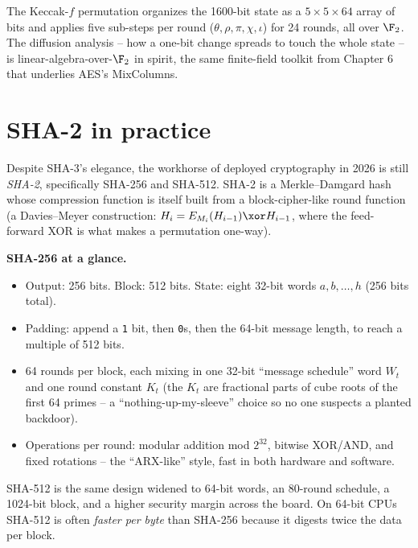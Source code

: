 \begin{connectionbox}
The Keccak-$f$ permutation organizes the 1600-bit state as a $5 \times 5 \times 64$ array of bits and applies five sub-steps per round ($\theta, \rho, \pi, \chi, \iota$) for 24 rounds, all over $\F_2$. The diffusion analysis -- how a one-bit change spreads to touch the whole state -- is linear-algebra-over-$\F_2$ in spirit, the same finite-field toolkit from Chapter 6 that underlies AES's MixColumns.
\end{connectionbox}

\section{SHA-2 in practice}
\label{ch14:sha2}

Despite SHA-3's elegance, the workhorse of deployed cryptography in 2026 is still \emph{SHA-2}, specifically SHA-256 and SHA-512. SHA-2 is a Merkle--Damgard hash whose compression function is itself built from a block-cipher-like round function (a Davies--Meyer construction: $H_i = E_{M_i}(H_{i-1}) \xor H_{i-1}$, where the feed-forward XOR is what makes a permutation one-way).

\begin{focusbox}
\textbf{SHA-256 at a glance.}
\begin{itemize}
  \item Output: 256 bits. Block: 512 bits. State: eight 32-bit words $a, b, \dots, h$ (256 bits total).
  \item Padding: append a \texttt{1} bit, then \texttt{0}s, then the 64-bit message length, to reach a multiple of 512 bits.
  \item 64 rounds per block, each mixing in one 32-bit ``message schedule'' word $W_t$ and one round constant $K_t$ (the $K_t$ are fractional parts of cube roots of the first 64 primes -- a ``nothing-up-my-sleeve'' choice so no one suspects a planted backdoor).
  \item Operations per round: modular addition mod $2^{32}$, bitwise XOR/AND, and fixed rotations -- the ``ARX-like'' style, fast in both hardware and software.
\end{itemize}
SHA-512 is the same design widened to 64-bit words, an 80-round schedule, a 1024-bit block, and a higher security margin across the board. On 64-bit CPUs SHA-512 is often \emph{faster per byte} than SHA-256 because it digests twice the data per block.
\end{focusbox}

